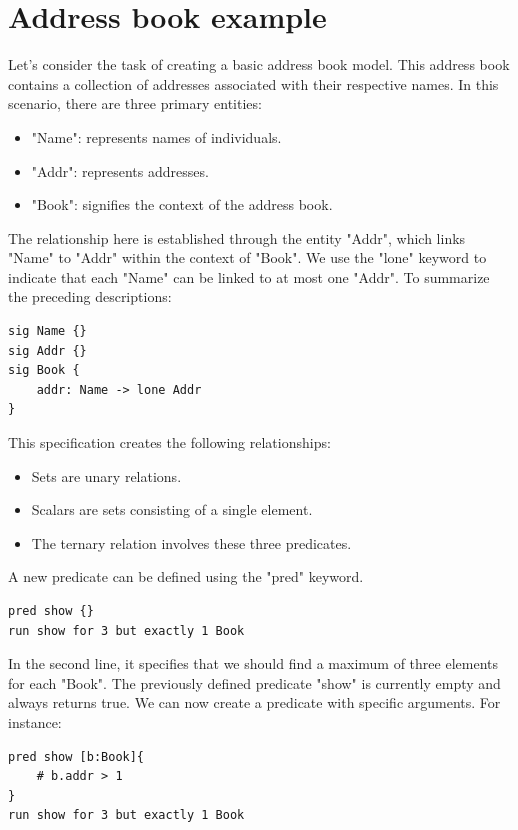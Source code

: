\documentclass[12pt, a4paper]{report}
\begin{document}
        \section{Address book example}
        Let's consider the task of creating a basic address book model. 
        This address book contains a collection of addresses associated with their respective names.
        In this scenario, there are three primary entities:
        \begin{itemize}
            \item "Name": represents names of individuals.
            \item "Addr": represents addresses.
            \item "Book": signifies the context of the address book.
        \end{itemize}
        The relationship here is established through the entity "Addr", which links "Name" to "Addr" within the context of "Book". 
        We use the "lone" keyword to indicate that each "Name" can be linked to at most one "Addr". To summarize the preceding descriptions:
        \begin{lstlisting}[language=alloy]
sig Name {}
sig Addr {}
sig Book {
    addr: Name -> lone Addr
}
        \end{lstlisting}
        This specification creates the following relationships: 
        \begin{itemize}
            \item Sets are unary relations.
            \item Scalars are sets consisting of a single element.
            \item The ternary relation involves these three predicates.
        \end{itemize}
        A new predicate can be defined using the "pred" keyword.
        \begin{lstlisting}[language=alloy]
pred show {}
run show for 3 but exactly 1 Book
        \end{lstlisting}
        In the second line, it specifies that we should find a maximum of three elements for each "Book". 
        The previously defined predicate "show" is currently empty and always returns true.
        We can now create a predicate with specific arguments. 
        For instance:
        \begin{lstlisting}[language=alloy]
pred show [b:Book]{
    # b.addr > 1
}
run show for 3 but exactly 1 Book
        \end{lstlisting}
\end{document}
